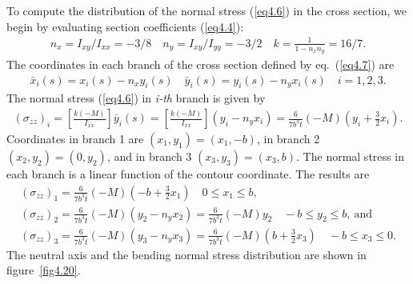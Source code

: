 \documentclass{AeroStructure-ERJohnson}
\begin{document}
\begin{example}
To compute the distribution of the normal stress (\ref{eq4.6}) in the cross section, we begin by evaluating section coefficients (\ref{eq4.4}):
\begin{align}\label{ex4.4b}
n_{x}=I_{x y}/I_{x x}=-3/8 \quad n_{y}=I_{x y}/I_{y y}=-3/2 \quad k=\frac{1}{1-n_{x} n_{y}}=16/7.
\end{align}
The coordinates in each branch of the cross section defined by eq.~(\ref{eq4.7}) are
\begin{align}\label{ex4.4c}
\bar{x}_{i}(s)=x_{i}(s)-n_{x} y_{i}(s) \quad \bar{y}_{i}(s)=y_{i}(s)-n_{y} x_{i}(s) \quad i=1,2,3.
\end{align}\pagebreak
The normal stress (\ref{eq4.6}) in \textit{i-th} branch is given by
\begin{align}\label{ex4.4d}
\left(\sigma_{z z}\right)_{i}=\left[\frac{k(-M)}{I_{x x}}\right] \bar{y}_{i}(s)=\left[\frac{k(-M)}{I_{x x}}\right]\left(y_{i}-n_{y} x_{i}\right)=\frac{6}{7 b^{3} t}(-M)\left(y_{i}+\frac{3}{2} x_{i}\right).
\end{align}
Coordinates in branch 1 are $\left(x_{1}, y_{1}\right)=\left(x_{1},-b\right)$, in branch 2 $\left(x_{2}, y_{2}\right)=\left(0, y_{2}\right)$, and in branch 3 $\left(x_{3}, y_{3}\right)=\left(x_{3}, b\right)$. The normal stress in each branch is a linear function of the contour coordinate. The results are
\begin{gather}
\left(\sigma_{z z}\right)_{1}=\frac{6}{7 b^{3} t}(-M)\left(-b+\frac{3}{2} x_{1}\right) \quad 0 \leq x_{1} \leq b,\label{ex4.4e}\\[6pt]
\left(\sigma_{z z}\right)_{2}=\frac{6}{7 b^{3} t}(-M)\left(y_{2}-n_{y} x_{2}\right)=\frac{6}{7 b^{3} t}(-M) y_{2} \quad-b \leq y_{2} \leq b,\ \text{and}\label{ex4.4f}\\[6pt]
\left(\sigma_{z z}\right)_{3}=\frac{6}{7 b^{3} t}(-M)\left(y_{3}-n_{y} x_{3}\right)=\frac{6}{7 b^{3} t}(-M)\left(b+\frac{3}{2} x_{3}\right) \quad-b \leq x_{3} \leq 0.\label{ex4.4g}
\end{gather}
The neutral axis and the bending normal stress distribution are shown in figure~\ref{fig4.20}.
\end{example}
\end{document}
